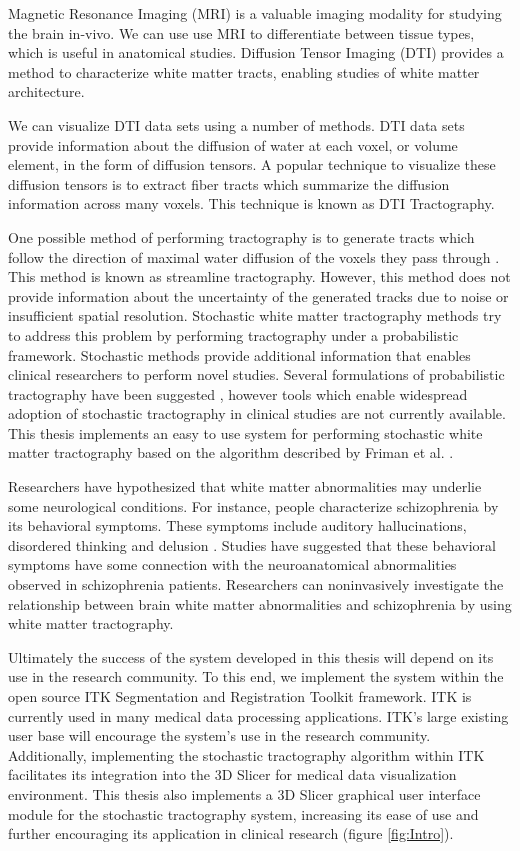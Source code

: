 \documentclass{InsightArticle}
\begin{document}
Magnetic Resonance Imaging (MRI) is a valuable imaging modality for studying the brain in-vivo.  We can use use MRI to differentiate between tissue types, which is useful in anatomical studies.  Diffusion Tensor Imaging (DTI) provides a method to characterize white matter tracts, enabling studies of white matter architecture.

We can visualize DTI data sets using a number of methods.  DTI data sets provide information about the diffusion of water at each voxel, or volume element, in the form of diffusion tensors.  A popular technique to visualize these diffusion tensors is to extract fiber tracts which summarize the diffusion information across many voxels.  This technique is known as DTI Tractography.

One possible method of performing tractography is to generate tracts which follow the direction of maximal water diffusion of the voxels they pass through \cite{Mori99, Basser00}.  This method is known as streamline tractography.  However, this method does not provide information about the uncertainty of the generated tracks due to noise or insufficient spatial resolution.  Stochastic white matter tractography methods try to address this problem by performing tractography under a probabilistic framework.  Stochastic methods provide additional information that enables clinical researchers to perform novel studies.  Several formulations of probabilistic tractography have been suggested \cite{bjornemoMICCAI02,behrensMRM03,Tuch01,derek,Lazar05}, however tools which enable widespread adoption of stochastic tractography in clinical studies are not currently available.  This thesis implements an easy to use system for performing stochastic white matter tractography based on the algorithm described by Friman et al. \cite{frimanMICCAI05, frimanTMI06}.

Researchers have hypothesized that white matter abnormalities may underlie some neurological conditions.  For instance, people characterize schizophrenia by its behavioral symptoms.  These symptoms include auditory hallucinations, disordered thinking and delusion \cite{kubickiNYAS05}.  Studies have suggested that these behavioral symptoms have some connection with the neuroanatomical abnormalities observed in schizophrenia patients\cite{kubickiNYAS05}.  Researchers can noninvasively investigate the relationship between brain white matter abnormalities and schizophrenia by using white matter tractography.

Ultimately the success of the system developed in this thesis will depend on its use in the research community.  To this end, we implement the system within the open source ITK Segmentation and Registration Toolkit \cite{itk} framework.  ITK is currently used in many medical data processing applications.  ITK's large existing user base will encourage the system's use in the research community.  Additionally, implementing the stochastic tractography algorithm within ITK facilitates its integration into the 3D Slicer \cite{3Dslicer} for medical data visualization environment.  This thesis also implements a 3D Slicer graphical user interface module for the stochastic tractography system, increasing its ease of use and further encouraging its application in clinical research (figure \ref{fig:Intro}).
\end{document}

